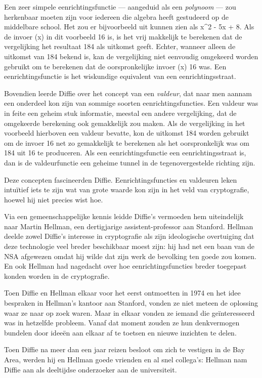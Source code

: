 \documentclass[smalldemyvopaper,11pt,twoside,onecolumn,openright,extrafontsizes,hidelinks]{memoir}
\begin{document}
Een zeer simpele eenrichtingsfunctie --- aangeduid als een
\emph{polynoom} --- zou herkenbaar moeten zijn voor iedereen die algebra
heeft gestudeerd op de middelbare school. Het zou er bijvoorbeeld uit
kunnen zien als x\^{}2 - 5x + 8. Als de invoer (x) in dit voorbeeld 16
is, is het vrij makkelijk te berekenen dat de vergelijking het resultaat
184 als uitkomst geeft. Echter, wanneer alleen de uitkomst van 184
bekend is, kan de vergelijking niet eenvoudig omgekeerd worden gebruikt
om te berekenen dat de oorspronkelijke invoer (x) 16 was. Een
eenrichtingsfunctie is het wiskundige equivalent van een
eenrichtingsstraat.

Bovendien leerde Diffie over het concept van een \emph{valdeur}, dat
naar men aannam een onderdeel kon zijn van sommige soorten
eenrichtingsfuncties. Een valdeur was in feite een geheim stuk
informatie, meestal een andere vergelijking, dat de omgekeerde
berekening ook gemakkelijk zou maken. Als de vergelijking in het
voorbeeld hierboven een valdeur bevatte, kon de uitkomst 184 worden
gebruikt om de invoer 16 net zo gemakkelijk te berekenen als het
oorspronkelijk was om 184 uit 16 te produceren. Als een
eenrichtingsfunctie een eenrichtingsstraat is, dan is de valdeurfunctie
een geheime tunnel in de tegenovergestelde richting zijn.

Deze concepten fascineerden Diffie. Eenrichtingsfuncties en valdeuren
leken intuïtief iets te zijn wat van grote waarde kon zijn in het veld
van cryptografie, hoewel hij niet precies wist hoe.

Via een gemeenschappelijke kennis leidde Diffie's vermoeden hem
uiteindelijk naar Martin Hellman, een dertigjarige assistent-professor
aan Stanford. Hellman deelde zowel Diffie's interesse in cryptografie
als zijn ideologische overtuiging dat deze technologie veel breder
beschikbaar moest zijn: hij had net een baan van de NSA afgewezen omdat
hij wilde dat zijn werk de bevolking ten goede zou komen. En ook Hellman
had nagedacht over hoe eenrichtingsfuncties breder toegepast konden
worden in de cryptografie.

Toen Diffie en Hellman elkaar voor het eerst ontmoetten in 1974 en het
idee bespraken in Hellman's kantoor aan Stanford, vonden ze niet meteen
de oplossing waar ze naar op zoek waren. Maar in elkaar vonden ze iemand
die geïnteresseerd was in hetzelfde probleem. Vanaf dat moment zouden ze
hun denkvermogen bundelen door ideeën aan elkaar af te toetsen en nieuwe
inzichten te delen.

Toen Diffie na meer dan een jaar reizen besloot om zich te vestigen in
de Bay Area, werden hij en Hellman goede vrienden en al snel collega's:
Hellman nam Diffie aan als deeltijdse onderzoeker aan de universiteit.
\end{document}
